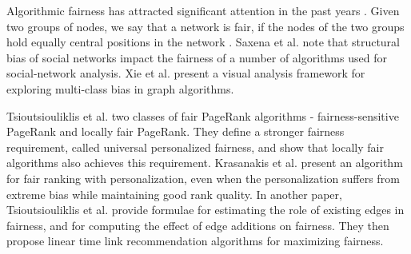 Algorithmic fairness has attracted significant attention in the past years \cite{tsioutsiouliklis2021fairness}. Given two groups of nodes, we say that a network is fair, if the nodes of the two groups hold equally central positions in the network \cite{pitoura2023pagerank}. Saxena et al. \cite{saxena2022fairsna} note that structural bias of social networks impact the fairness of a number of algorithms used for social-network analysis. Xie et al. \cite{xie2021fairrankvis} present a visual analysis framework for exploring multi-class bias in graph algorithms.

Tsioutsiouliklis et al. \cite{tsioutsiouliklis2021fairness} two classes of fair PageRank algorithms - fairness-sensitive PageRank and locally fair PageRank. They define a stronger fairness requirement, called universal personalized fairness, and show that locally fair algorithms also achieves this requirement. Krasanakis et al. \cite{krasanakis2021applying} present an algorithm for fair ranking with personalization, even when the personalization suffers from extreme bias while maintaining good rank quality. In another paper, Tsioutsiouliklis et al. \cite{tsioutsiouliklis2022link} provide formulae for estimating the role of existing edges in fairness, and for computing the effect of edge additions on fairness. They then propose linear time link recommendation algorithms for maximizing fairness.

